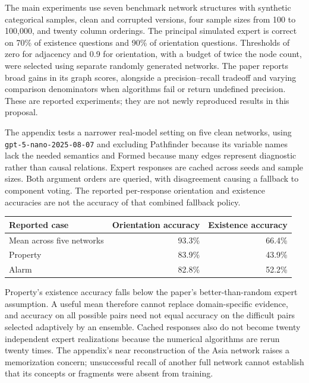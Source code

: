 The main experiments use seven benchmark network structures with synthetic
categorical samples, clean and corrupted versions, four sample sizes from 100
to 100,000, and twenty column orderings. The principal simulated expert is
correct on 70\% of existence questions and 90\% of orientation questions.
Thresholds of zero for adjacency and 0.9 for orientation, with a budget of twice
the node count, were selected using separate randomly generated networks. The
paper reports broad gains in its graph scores, alongside a precision--recall
tradeoff and varying comparison denominators when algorithms fail or return
undefined precision. These are reported experiments; they are not newly
reproduced results in this proposal. \citep{exec20_expert_averaging}

The appendix tests a narrower real-model setting on five clean networks,
using \texttt{gpt-5-nano-}\allowbreak\texttt{2025-08-07} and excluding Pathfinder
because its variable names lack the needed semantics and Formed because many
edges represent diagnostic rather than causal relations. Expert responses are
cached across seeds and sample sizes. Both argument orders are queried, with
disagreement causing a fallback to component voting. The reported per-response
orientation and existence accuracies are not the accuracy of that combined
fallback policy. \citep{exec20_expert_averaging}

\begin{center}
\begin{tabular}{lrr}
\hline
Reported case & Orientation accuracy & Existence accuracy\\
\hline
Mean across five networks & 93.3\% & 66.4\%\\
Property & 83.9\% & 43.9\%\\
Alarm & 82.8\% & 52.2\%\\
\hline
\end{tabular}
\end{center}
Property's existence accuracy falls below the paper's better-than-random expert
assumption. A useful mean therefore cannot replace domain-specific evidence,
and accuracy on all possible pairs need not equal accuracy on the difficult
pairs selected adaptively by an ensemble. Cached responses also do not become
twenty independent expert realizations because the numerical algorithms are
rerun twenty times. The appendix's near reconstruction of the Asia network
raises a memorization concern; unsuccessful recall of another full network
cannot establish that its concepts or fragments were absent from training.
\citep{exec20_expert_averaging}


